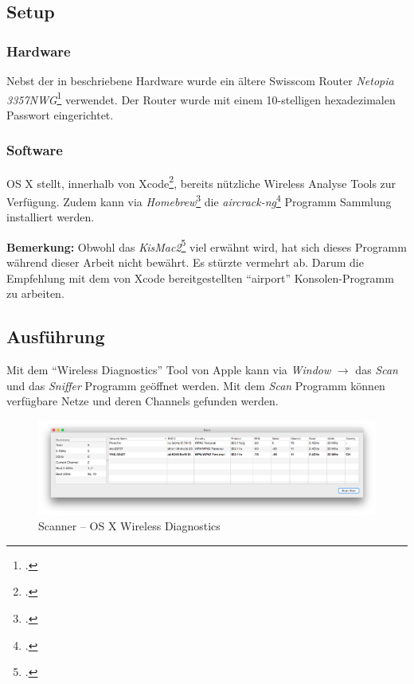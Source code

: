 \subsection{Setup}
\subsubsection{Hardware}
Nebst der in  beschriebene Hardware wurde ein ältere Swisscom Router \textit{Netopia  3357NWG}\footcite{Netopia_3347_57nwg_de_2015-04-06} verwendet. Der Router wurde mit einem 10-stelligen hexadezimalen Passwort eingerichtet.

\subsubsection{Software}
OS X stellt, innerhalb von Xcode\footcite{Xcode_Apple_Developer_2015-04-06}, bereits nützliche Wireless Analyse Tools zur Verfügung.
Zudem kann via \textit{Homebrew}\footcite{Homebrew__The_missing_package_manager_for_OS_X_2015-04-06} die \textit{aircrack-ng}\footcite{Aircrack-ng_2015-04-06} Programm Sammlung installiert werden.

\begin{framed}
	\textbf{Bemerkung:} Obwohl das \textit{KisMac2}\footcite{IGR_Software_KisMac2_2015-04-06} viel erwähnt wird, hat sich dieses Programm während dieser Arbeit nicht bewährt. Es stürzte vermehrt ab. Darum die Empfehlung mit dem von Xcode bereitgestellten "`airport"' Konsolen-Programm zu arbeiten.
\end{framed}

\subsection{Ausführung}
Mit dem "`Wireless Diagnostics"' Tool von Apple kann via \textit{Window} $\rightarrow$ das \textit{Scan} und das \textit{Sniffer} Programm geöffnet werden.
Mit dem \textit{Scan} Programm können verfügbare Netze und deren Channels gefunden werden.

\begin{figure}[H]
	\centering
	\includegraphics[width=1.0\textwidth]{images/wep/scan.png}
	\caption{Scanner -- OS X Wireless Diagnostics}
\end{figure}

